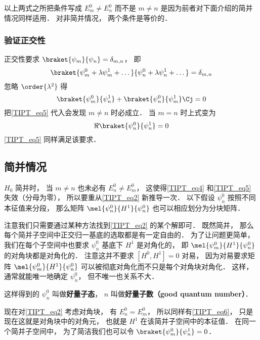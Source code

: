 以上两式之所把条件写成 $E_m^0 \ne E_n^0$ 而不是 $m \ne n$ 是因为前者对下面介绍的简并情况同样适用． 对非简并情况， 两个条件是等价的．

\subsubsection{验证正交性}
正交性要求 $\braket{\psi_m}{\psi_n} = \delta_{m,n}$， 即
\begin{equation}
\braket{\psi_m^0 + \lambda \psi_m^1 + \dots}{\psi_n^0 + \lambda \psi_n^1 + \dots} = \delta_{m,n}
\end{equation}
忽略 $\order{\lambda^2}$ 得
\begin{equation}
\braket{\psi_m^0}{\psi_n^1} + \braket{\psi_n^0}{\psi_m^1}\Cj = 0
\end{equation}
把\autoref{TIPT_eq5} 代入会发现 $m \ne n$ 时必成立． 当 $m = n$ 时上式变为
\begin{equation}
\Re{\braket{\psi_n^0}{\psi_n^1}} = 0
\end{equation}
\autoref{TIPT_eq5} 同样满足该要求．

\subsection{简并情况}
$H_0$ 简并时， 当 $m\ne n$ 也未必有 $E_n^0 \ne E_m^0$， 这使得\autoref{TIPT_eq4} 和\autoref{TIPT_eq5} 失效（分母为零）， 所以要重从\autoref{TIPT_eq2} 新推导一次． 以下假设 $\psi_n^0$ 按照不同本征值来分段， 那么矩阵 $\mel{\psi_n^0}{H^1}{\psi_n^0}$ 也可以相应划分为分块矩阵．

注意我们只需要通过某种方法找到\autoref{TIPT_eq2} 的某个解即可． 既然简并， 那么每个简并子空间中正交归一基底的选取都是有一定自由的． 为了让问题更简单， 我们在每个子空间中也要求 $\psi_n^0$ 基底下 $H^1$ 是对角化的， 即 $\mel{\psi_m^0}{H^1}{\psi_n^0}$ 的对角块都是对角化的． 注意这并不要求 $[H^0, H^1] = 0$ 对易， 因为对易要求矩阵 $\mel{\psi_m^0}{H^1}{\psi_n^0}$ 可以被彻底对角化而不只是每个对角块对角化． 这样， 通常就能唯一地确定 $\psi_n^0$， 但不唯一也关系不大．

这样得到的 $\psi_n^0$ 叫做\textbf{好量子态}， $n$ 叫做\textbf{好量子数（good quantum number）}．

现在对\autoref{TIPT_eq2} 考虑对角块， 有 $E_n^0 = E_m^0$， 所以同样有\autoref{TIPT_eq6}， 只是现在这就是对角块中的对角元， 也就是 $H^1$ 在该简并子空间中的本征值． 在同一个简并子空间中， 为了简洁我们也可以令 $\braket{\psi_m^0}{\psi_n^1} = 0$．

